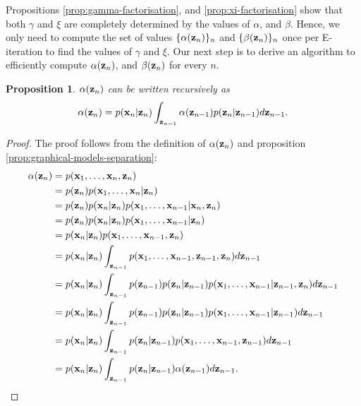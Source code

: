 \documentclass[11pt]{article}
\numberwithin{equation}{section}
\newcommand{\x}{{\bf x}}
\newcommand{\z}{{\bf z}}
\newtheorem{proposition}{Proposition}[section]
\begin{document}
Propositions \ref{prop:gamma-factorisation}, and \ref{prop:xi-factorisation} show that both $\gamma$ and $\xi$ are completely determined by the values of $\alpha$, and $\beta$. Hence, we only need to compute the set of values $\{\alpha(\z_n)\}_n$ and $\{\beta(\z_n)\}_n$ once per E-iteration to find the values of $\gamma$ and $\xi$. Our next step is to derive an algorithm to efficiently compute $\alpha(\z_n)$, and $\beta(\z_n)$ for every $n$.


\begin{proposition} \label{prop:alpha-recursive}
	$\alpha(\z_n)$ can be written recursively as
	\begin{equation}
		\alpha(\z_n) = p(\x_n\vert \z_n) \int_{\z_{n-1}} \alpha(\z_{n-1})p(\z_n\vert\z_{n-1}) d\z_{n-1}.
	\end{equation}
\end{proposition}

\begin{proof}
	The proof follows from the definition of $\alpha(\z_n)$ and proposition \ref{prop:graphical-models-separation}:
	\begin{align}
		\alpha(\z_n) &= p(\x_1, \ldots, \x_n, \z_n) \\
		&= p(\z_n) p(\x_1, \ldots, \x_n \vert \z_n) \\
		&= p(\z_n) p(\x_n \vert \z_n) p(\x_1, \ldots, \x_{n-1} \vert \x_n, \z_n) \\
		&= p(\z_n) p(\x_n \vert \z_n) p(\x_1, \ldots, \x_{n-1} \vert \z_n) \\
		&= p(\x_n \vert \z_n) p(\x_1, \ldots, \x_{n-1}, \z_n) \\
		&= p(\x_n \vert \z_n) \int_{\z_{n-1}}p(\x_1, \ldots, \x_{n-1}, \z_{n-1}, \z_n) d\z_{n-1}\\
		&= p(\x_n \vert \z_n) \int_{\z_{n-1}} p(\z_{n-1})p(\z_n \vert \z_{n-1})p(\x_1, \ldots, \x_{n-1} \vert \z_{n-1}, \z_n) d\z_{n-1}\\
		&= p(\x_n \vert \z_n) \int_{\z_{n-1}} p(\z_{n-1})p(\z_n \vert \z_{n-1})p(\x_1, \ldots, \x_{n-1} \vert \z_{n-1}) d\z_{n-1}\\
		&= p(\x_n \vert \z_n) \int_{\z_{n-1}} p(\z_n \vert \z_{n-1})p(\x_1, \ldots, \x_{n-1}, \z_{n-1}) d\z_{n-1}\\
		&= p(\x_n \vert \z_n) \int_{\z_{n-1}} p(\z_n \vert \z_{n-1})\alpha(\z_{n-1}) d\z_{n-1}.\\
	\end{align}
\end{proof}
\end{document}

